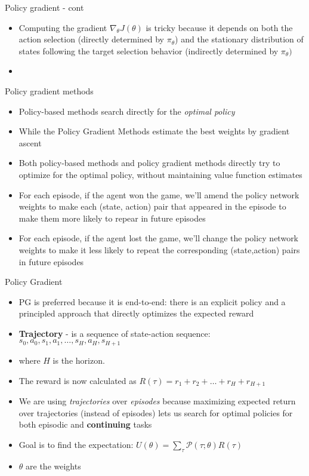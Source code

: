 \documentclass[10pt,mathserif]{beamer}
\begin{document}
\begin{frame}{Policy gradient - cont}
\begin{itemize}
\item Computing the gradient $\nabla_\theta J(\theta)$ is tricky because it depends on both the action selection
(directly determined by $\pi_\theta$) and the stationary distribution of states following the target selection 
behavior (indirectly determined by $\pi_\theta)$
\item  
\end{itemize}
\end{frame}

\begin{frame}{Policy gradient methods}
\begin{itemize}
\item Policy-based methods search directly for the \textit{optimal policy}
\item While the Policy Gradient Methods estimate the best weights by gradient 
ascent
\item Both policy-based methods and policy gradient methods directly try to
optimize for the optimal policy, without maintaining value function estimates
\item For each episode, if the agent won the game, we'll amend the policy network weights to make each (state, action) pair that appeared in the episode to make
them more likely to repear in future episodes
\item For each episode, if the agent lost the game, we'll change the policy 
network weights to make it less likely to repeat the corresponding (state,action) pairs in future episodes
\end{itemize}
\end{frame}

\begin{frame}{Policy Gradient}
\begin{itemize}
\item PG is preferred because it is end-to-end: there is an explicit
policy and a principled approach that directly optimizes the expected reward 
\item \textbf{Trajectory} - is a sequence of state-action sequence: 
$s_0,a_0,s_1,a_1,\dots, s_H, a_H, s_{H+1}$
\item where $H$ is the horizon.
\item The reward is now calculated as $R(\tau) = r_1 + r_2 + \dots + r_H + r_{H+1}$  
\item We are using \textit{trajectories} over \textit{episodes} because maximizing expected return over trajectories (instead of episodes) lets us search for optimal policies for both episodic and \textbf{continuing} tasks
\item Goal is to find the expectation: $U(\theta) = \sum_{\tau}\mathcal{P}(\tau;\theta)R(\tau)$
\item $\theta$ are the weights
\end{itemize}
\end{frame}
\end{document}
